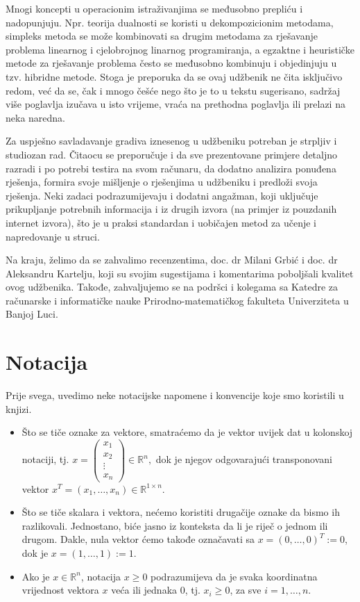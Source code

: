\documentclass[a4paper, utf8, 11pt, colorlinks]{book}
\theoremstyle{definition}
\begin{document}
Mnogi koncepti u operacionim istraživanjima se međusobno prepliću i nadopunjuju. Npr. teorija dualnosti se koristi u dekompozicionim metodama, simpleks metoda se može kombinovati sa drugim metodama za rješavanje problema linearnog i cjelobrojnog linarnog programiranja, a egzaktne i heurističke metode za rješavanje problema često se međusobno kombinuju i objedinjuju u tzv. hibridne metode.
Stoga je preporuka da se ovaj udžbenik ne čita isključivo redom, već da se, čak i mnogo češće nego što je to u tekstu sugerisano, sadržaj više poglavlja izučava u isto vrijeme, vraća na prethodna poglavlja ili prelazi na neka naredna.


Za uspješno savladavanje gradiva iznesenog u udžbeniku potreban je strpljiv i studiozan rad. Čitaocu se preporučuje i da sve prezentovane primjere detaljno razradi i po potrebi testira na svom računaru, da dodatno analizira ponuđena rješenja, formira svoje mišljenje o rješenjima u udžbeniku i predloži svoja rješenja. Neki zadaci podrazumijevaju i dodatni angažman, koji uključuje prikupljanje potrebnih informacija i iz drugih izvora (na primjer iz pouzdanih internet izvora),  što je u praksi standardan i uobičajen metod za učenje i napredovanje u struci.

Na kraju, želimo da se zahvalimo recenzentima, doc. dr Milani Grbić i doc. dr Aleksandru Kartelju, koji su svojim sugestijama i komentarima poboljšali kvalitet ovog udžbenika. Takođe, zahvaljujemo se na podršci i kolegama sa Katedre za računarske i informatičke nauke Prirodno-matematičkog fakulteta Univerziteta u Banjoj Luci.


\chapter*{Notacija}

Prije svega, uvedimo neke notacijske napomene i konvencije koje smo koristili u knjizi.

\begin{itemize}
	\item Što se tiče oznake za vektore, smatraćemo da je vektor uvijek dat u kolonskoj notaciji, tj. 
	$x= \left (\begin{matrix}
		     x_1 \\
		     x_2 \\
		     \vdots\\
		     x_n
	\end{matrix} \right ) \in \mathbb{R}^n,$ dok je njegov odgovarajući transponovani vektor $x^T=(x_1,\ldots, x_n) \in \mathbb{R}^{1\times n}$. 
   \item Što se tiče skalara i vektora, nećemo koristiti drugačije oznake da bismo ih razlikovali. Jednostano, biće jasno iz konteksta da li je riječ o jednom ili drugom. Dakle, nula vektor ćemo takođe označavati sa $x = (0, \ldots, 0)^T := 0$, dok je $x=(1,\ldots, 1):=1$.  
   \item   Ako je $x \in \mathbb{R}^n$, notacija  $x \geq 0$ podrazumijeva da je svaka koordinatna vrijednost vektora $x$ veća ili jednaka 0, tj. $x_i \geq 0$, za sve $i=1,\ldots,n$. 
\end{itemize} 
\end{document}
